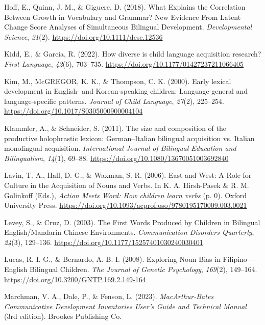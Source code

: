 \documentclass[10pt, letterpaper]{article}
\begin{document}
\begin{CSLReferences}{1}{0}
Hoff, E., Quinn, J. M., \& Giguere, D. (2018). What {Explains} the
{Correlation Between Growth} in {Vocabulary} and {Grammar}? {New
Evidence From Latent Change Score Analyses} of {Simultaneous Bilingual
Development}. \emph{Developmental Science}, \emph{21}(2).
\url{https://doi.org/10.1111/desc.12536}

Kidd, E., \& Garcia, R. (2022). How diverse is child language
acquisition research? \emph{First Language}, \emph{42}(6), 703--735.
\url{https://doi.org/10.1177/01427237211066405}

Kim, M., McGREGOR, K. K., \& Thompson, C. K. (2000). Early lexical
development in {English-} and {Korean-speaking} children:
Language-general and language-specific patterns. \emph{Journal of Child
Language}, \emph{27}(2), 225--254.
\url{https://doi.org/10.1017/S0305000900004104}

Klammler, A., \& Schneider, S. (2011). The size and composition of the
productive holophrastic lexicon: {German}--{Italian} bilingual
acquisition vs. {Italian} monolingual acquisition. \emph{International
Journal of Bilingual Education and Bilingualism}, \emph{14}(1), 69--88.
\url{https://doi.org/10.1080/13670051003692840}

Lavin, T. A., Hall, D. G., \& Waxman, S. R. (2006). East and {West}: {A
Role} for {Culture} in the {Acquisition} of {Nouns} and {Verbs}. In K.
A. Hirsh-Pasek \& R. M. Golinkoff (Eds.), \emph{Action {Meets Word}:
{How} children learn verbs} (p. 0). Oxford University Press.
\url{https://doi.org/10.1093/acprof:oso/9780195170009.003.0021}

Levey, S., \& Cruz, D. (2003). The {First Words Produced} by {Children}
in {Bilingual English}/{Mandarin Chinese Environments}.
\emph{Communication Disorders Quarterly}, \emph{24}(3), 129--136.
\url{https://doi.org/10.1177/15257401030240030401}

Lucas, R. I. G., \& Bernardo, A. B. I. (2008). Exploring {Noun Bias} in
{Filipino}---{English Bilingual Children}. \emph{The Journal of Genetic
Psychology}, \emph{169}(2), 149--164.
\url{https://doi.org/10.3200/GNTP.169.2.149-164}

Marchman, V. A., Dale, P., \& Fenson, L. (2023). \emph{{MacArthur-Bates
Communicative Development Inventories User}'s {Guide} and {Technical
Manual}} (3rd edition). Brookes Publishing Co.


\end{CSLReferences}
\end{document}

